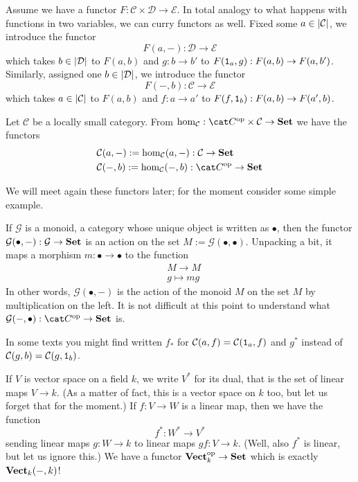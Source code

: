 Assume we have a functor \(F : \mathcal{C} \times \mathcal{D} \to \mathcal{E}\). In
total analogy to what happens with functions in two variables, we can
curry functors as well. Fixed some \(a \in \left\lvert\mathcal{C}\right\rvert\), we introduce
the functor
\[
  F(a, -) : \mathcal{D} \to \mathcal{E}
\]
which takes \(b \in \left\lvert\mathcal{D}\right\rvert\) to \(F(a, b)\) and \(g : b \to b'\)
to \(F(\mathtt 1_a, g) : F(a, b) \to F(a, b')\). Similarly, assigned one
\(b \in \left\lvert\mathcal{D}\right\rvert\), we introduce the functor
\[
  F(-, b) : \mathcal{C} \to \mathcal{E}
\]
which takes \(a \in \left\lvert\mathcal{C}\right\rvert\) to \(F(a, b)\) and \(f : a \to a'\)
to \(F(f, \mathtt 1_b) : F(a, b) \to F(a', b)\).

\begin{definition}\label{definition:hom-functors}
  Let \(\mathcal{C}\) be a locally small category. From
  \(\hom_{\mathcal{C}} : \opcat C \times \mathcal{C} \to \Set\) we have the
  functors
  \begin{align*}
    & \mathcal{C}(a, -) := \hom_{\mathcal{C}}(a, -) : \mathcal{C} \to \Set \\
    & \mathcal{C}(-, b) := \hom_{\mathcal{C}}(-, b) : \opcat C \to \Set
  \end{align*}
\end{definition}

We will meet again these functors later; for the moment consider some
simple example.

\begin{example}
  If \(\mathcal{G}\) is a monoid, a category whose unique object is written
  as \(\bullet\), then the functor
  \(\mathcal{G}(\bullet, -) : \mathcal{G} \to \mathbf{Set}\) is an action on the set
  \(M := \mathcal{G}(\bullet, \bullet)\). Unpacking a bit, it maps a morphism
  \(m : \bullet \to \bullet\) to the function
  \begin{align*}
    & M \to M \\
    & g \mapsto mg
  \end{align*}
  In other words, \(\mathcal{G} (\bullet, -)\) is the action of the monoid
  \(M\) on the set \(M\) by multiplication on the left. It is not
  difficult at this point to understand what
  \(\mathcal{G}(-, \bullet) : \opcat C \to \Set\) is.
\end{example}

In some texts you might find written \(f_\ast\) for
\(\mathcal{C}(a, f) = \mathcal{C}(\mathtt 1_a, f)\) and \(g^\ast\) instead of
\(\mathcal{C}(g, b) = \mathcal{C}(g, \mathtt 1_b)\).

\begin{example}\label{example:DualSpace}
  If \(V\) is vector space on a field \(k\), we write \(V^\ast\) for its
  dual, that is the set of linear maps \(V \to k\). (As a matter of
  fact, this is a vector space on \(k\) too, but let us forget that for
  the moment.) If \(f : V \to W\) is a linear map, then we have the
  function
  \[
    f^\ast : W^\ast \to V^\ast
  \]
  sending linear maps \(g : W \to k\) to linear maps \(gf : V \to
  k\). (Well, also \(f^\ast\) is linear, but let us ignore this.) We
  have a functor \(\mathbf{Vect}^\text{op}_k \to \mathbf{Set}\) which is exactly
  \(\mathbf{Vect}_k(-, k)\)!
\end{example}



